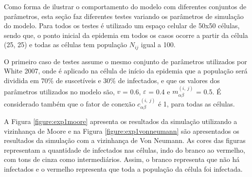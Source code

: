 \documentclass[a4paper,12pt]{article}
\begin{document}
Como forma de ilustrar o comportamento do modelo com diferentes conjuntos de parâmetros, esta seção faz diferentes testes variando os parâmetros de simulação do modelo. Para todos os testes é utilizado um espaço celular de 50x50 células, sendo que, o ponto inicial da epidemia em todos os casos ocorre a partir da célula (25, 25) e todas as células tem população $N_{ij}$ igual a 100.

O primeiro caso de testes assume o mesmo conjunto de parâmetros utilizados por White 2007\cite{White2007}, onde é aplicado na célula de início da epidemia que a população será dividida em 70\% de suscetíveis e 30\% de infectados, e que os valores dos parâmetros utilizados no modelo são, $v$ = 0.6, $\varepsilon$ = 0.4 e  $ m_{\alpha \beta}^{\left(i,\:j\right)}$ = 0.5. É considerado também que o fator de conexão $c_{\alpha \beta}^{\left(i,\:j\right)}$ é 1, para todas as células.

A Figura \ref{figure:exp1moore} apresenta os resultados da simulação utilizando a vizinhança de Moore e na Figura \ref{figure:exp1vonneumann} são apresentados os resultados da simulação com a vizinhança de Von Neumann. As cores das figuras representam a quantidade de infectados nas células, indo do branco ao vermelho, com tons de cinza como intermediários. Assim, o branco representa que não há infectados e o vermelho representa que toda a população da célula foi infectada.
\end{document}
